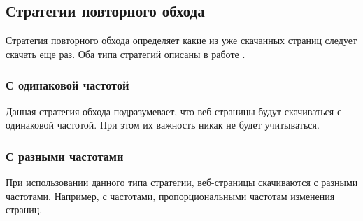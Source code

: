 \subsection{Стратегии повторного обхода}

Стратегия повторного обхода определяет какие из уже скачанных страниц следует скачать еще раз. Оба типа стратегий описаны в работе \cite{Cho}. 

\subsubsection*{С одинаковой частотой}

Данная стратегия обхода подразумевает, что веб-страницы будут скачиваться с одинаковой частотой. При этом их важность никак не будет учитываться.

\subsubsection*{С разными частотами}

При использовании данного типа стратегии, веб-страницы скачиваются с разными частотами. Например, с частотами, пропорциональными частотам изменения страниц.
